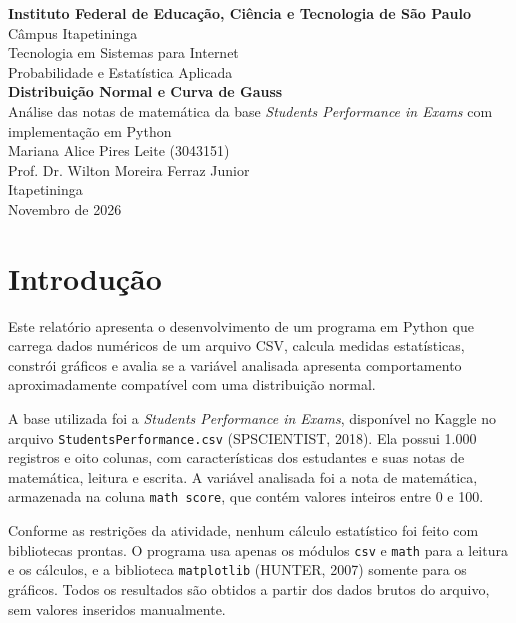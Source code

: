 \documentclass[12pt,a4paper]{article}
\newcommand{\instituicao}{Instituto Federal de Educação, Ciência e Tecnologia de São Paulo}
\newcommand{\campus}{Câmpus Itapetininga}
\newcommand{\curso}{Tecnologia em Sistemas para Internet}
\newcommand{\disciplina}{Probabilidade e Estatística Aplicada}
\newcommand{\professor}{Wilton Moreira Ferraz Junior}
\newcommand{\autor}{Mariana Alice Pires Leite (3043151)}
\newcommand{\titulo}{Distribuição Normal e Curva de Gauss}
\newcommand{\subtitulo}{Análise das notas de matemática da base \textit{Students Performance in Exams} com implementação em Python}
\begin{document}
\begin{titlepage}
  \centering
  {\large \textbf{\instituicao}}\\[0.2cm]
  {\large \campus}\\[0.2cm]
  {\large \curso}\\[0.2cm]
  {\large \disciplina}\\
  \vfill
  {\LARGE \textbf{\titulo}}\\[0.6cm]
  {\large \subtitulo}\\
  \vfill
  {\large \autor}\\[1.2cm]
  {\large Prof. Dr. \professor}\\
  \vfill
  {\large Itapetininga}\\[0.2cm]
  {\large Novembro de 2026}
\end{titlepage}

\thispagestyle{empty}
\tableofcontents
\clearpage

\section{Introdução}

Este relatório apresenta o desenvolvimento de um programa em Python que carrega dados numéricos de um arquivo CSV, calcula medidas estatísticas, constrói gráficos e avalia se a variável analisada apresenta comportamento aproximadamente compatível com uma distribuição normal.

A base utilizada foi a \textit{Students Performance in Exams}, disponível no Kaggle no arquivo \texttt{StudentsPerformance.csv} (SPSCIENTIST, 2018). Ela possui 1.000 registros e oito colunas, com características dos estudantes e suas notas de matemática, leitura e escrita. A variável analisada foi a nota de matemática, armazenada na coluna \texttt{math score}, que contém valores inteiros entre 0 e 100.

Conforme as restrições da atividade, nenhum cálculo estatístico foi feito com bibliotecas prontas. O programa usa apenas os módulos \texttt{csv} e \texttt{math} para a leitura e os cálculos, e a biblioteca \texttt{matplotlib} (HUNTER, 2007) somente para os gráficos. Todos os resultados são obtidos a partir dos dados brutos do arquivo, sem valores inseridos manualmente.
\end{document}
